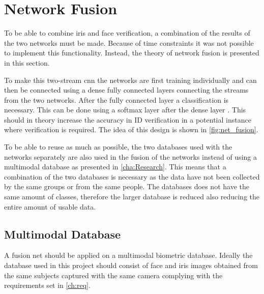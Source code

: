 \section{Network Fusion}
To be able to combine iris and face verification, a combination of the results of the two networks must be made. Because of time constraints it was not possible to implement this functionality. Instead, the theory of network fusion is presented in this section.

To make this two-stream \gls{cnn} the networks are first training individually and can then be connected using a dense fully connected layers connecting the streams from the two networks. After the fully connected layer a classification is necessary. This can be done using a softmax layer after the dense layer \citep{Eitel2015}. This should in theory increase the accuracy in ID verification in a potential instance where verification is required. The idea of this design is shown in \autoref{fig:net_fusion}.

To be able to reuse as much as possible, the two databases used with the networks separately are also used in the fusion of the networks instead of using a multimodal database as presented in \autoref{cha:Research}. 
This means that a combination of the two databases is necessary as the data have not been collected by the same groups or from the same people. The databases does not have the same amount of classes, therefore the larger database is reduced also reducing the entire amount of usable data.

\subsection{Multimodal Database}
A fusion net should be applied on a multimodal biometric database. Ideally the database used in this project should consist of face and iris images obtained from the same subjects captured with the same camera complying with the requirements set in \autoref{ch:req}. 

